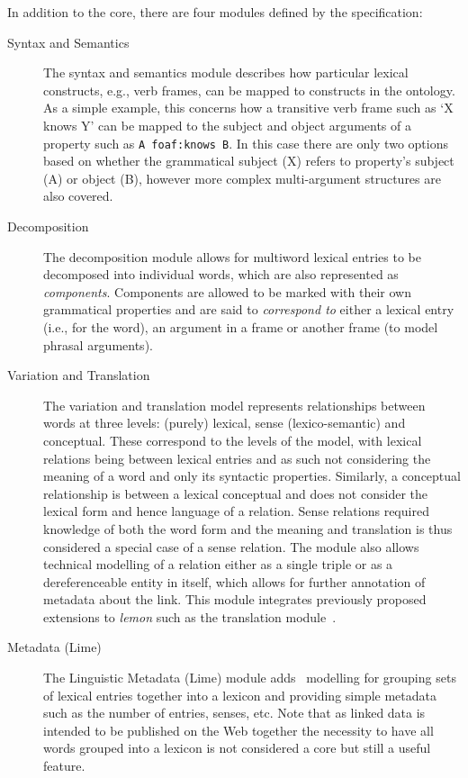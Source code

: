 \documentclass[12pt,a4paper]{elex2017}
\begin{document}
In addition to the core, there are four modules defined by the specification:

\begin{description}
    \item[Syntax and Semantics] The syntax and semantics module describes how
        particular lexical constructs, e.g., verb frames, can be mapped to
        constructs in the ontology. As a simple example, this concerns how a
        transitive verb frame such as `X knows Y' can be mapped to the subject
        and object arguments of a property such as \texttt{A foaf:knows B}. In this
        case there are only two options based on whether the grammatical subject
        (X) refers to property's subject (A) or object (B), however more complex
        multi-argument structures are also covered.
    \item[Decomposition] The decomposition module allows for multiword lexical
        entries to be decomposed into individual words, which are also
        represented as \emph{components}. Components are allowed to be marked
        with their own grammatical properties and are said to \emph{correspond
        to} either a lexical entry (i.e., for the word), an argument in a frame
        or another frame (to model phrasal arguments). 
    \item[Variation and Translation] The variation and translation model
        represents relationships between words at three levels: (purely)
        lexical, sense (lexico-semantic) and conceptual. These correspond
        to the levels of the model, with lexical relations being between lexical
        entries and as such not considering the meaning of a word and only its
        syntactic properties. Similarly, a conceptual relationship is between a
        lexical conceptual and does not consider the lexical form and hence
        language of a relation. Sense relations required knowledge of
        both the word form and the meaning and translation is thus considered a
        special case of a sense relation. The module also allows technical
        modelling of a relation either as a single triple or as a
        dereferenceable entity in itself, which allows for further annotation of
        metadata about the link. This module integrates previously proposed
        extensions to \emph{lemon} such as the translation
        module~\citep{gracia_lrec2014_translation}.
    \item[Metadata (Lime)] The Linguistic Metadata (Lime) module adds~\citep{Fiorelli13Lime} modelling
        for grouping sets of lexical entries together into a lexicon and
        providing simple metadata such as the number of entries, senses, etc.
        Note that as linked data is intended to be published on the Web together
        the necessity to have all words grouped into a lexicon is not considered
        a core but still a useful feature.
\end{description}
\end{document}
